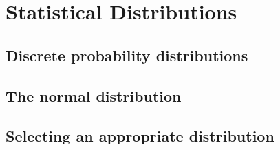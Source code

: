 \chapter{Statistical Distributions}

\section{Discrete probability distributions}
\section{The normal distribution}
\section{Selecting an appropriate distribution}